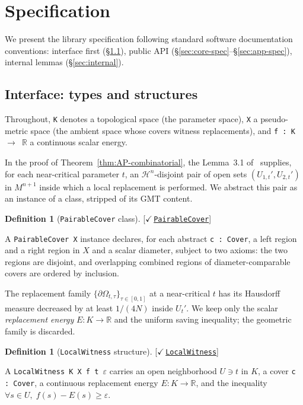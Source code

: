 \documentclass[11pt,reqno]{amsart}
\theoremstyle{definition}
\newtheorem{definition}[theorem]{Definition}
\newcommand{\leanrepo}{https://github.com/MathNetwork/comb_arg/blob/v0.1.0/CombArg}
\newcommand{\leanmargin}[2]{%
  \nopagebreak\hfill{\normalfont\small\color{leangreen}%
    [\ensuremath{\checkmark}\,\href{\leanrepo/#2}{\texttt{#1}}]}\par\nopagebreak
}
\begin{document}
\section{Specification}
\label{sec:spec}

We present the library specification following standard software
documentation conventions: interface first
(\S\ref{sec:interface}), public API
(\S\ref{sec:core-spec}--\S\ref{sec:app-spec}), internal lemmas
(\S\ref{sec:internal}).

\subsection{Interface: types and structures}
\label{sec:interface}

Throughout, \texttt{K} denotes a topological space (the parameter
space), \texttt{X} a pseudo-metric space (the ambient space whose
covers witness replacements), and \texttt{f : K $\to$ $\mathbb{R}$}
a continuous scalar energy.

In the proof of Theorem~\ref{thm:AP-combinatorial}, the
Lemma~3.1 of~\cite{DLT13} supplies, for each near-critical
parameter $t$, an $\mathcal{H}^n$-disjoint pair of open sets
$(U_{1,t}', U_{2,t}')$ in $M^{n+1}$ inside which a local
replacement is performed. We abstract this pair as an instance of
a class, stripped of its GMT content.

\begin{definition}[\texttt{PairableCover} class]
\label{def:pcover}
\leanmargin{PairableCover}{Witness.lean}
A \texttt{PairableCover X} instance declares, for each abstract
\texttt{c : Cover}, a left region and a right region in $X$ and a
scalar diameter, subject to two axioms: the two regions are
disjoint, and overlapping combined regions of diameter-comparable
covers are ordered by inclusion.
\end{definition}

The replacement family
$\{\partial \Omega_{t,\tau}\}_{\tau \in [0,1]}$ at a near-critical
$t$ has its Hausdorff measure decreased by at least $1/(4N)$
inside $U_t'$. We keep only the scalar \emph{replacement energy}
$E : K \to \mathbb{R}$ and the uniform saving inequality; the
geometric family is discarded.

\begin{definition}[\texttt{LocalWitness} structure]
\label{def:witness}
\leanmargin{LocalWitness}{Witness.lean}
A \texttt{LocalWitness K X f t $\varepsilon$} carries an open
neighborhood $U \ni t$ in $K$, a cover \texttt{c : Cover}, a
continuous replacement energy $E : K \to \mathbb{R}$, and the
inequality $\forall s \in U,\; f(s) - E(s) \ge \varepsilon$.
\end{definition}
\end{document}
